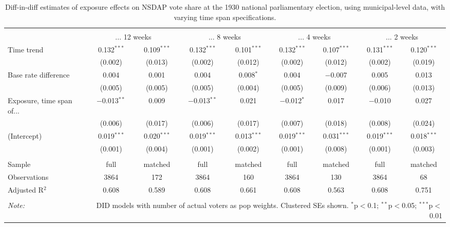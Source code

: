 
\begin{table}[!htbp] \centering 
  \caption{Diff-in-diff estimates of exposure effects on NSDAP vote share at the 1930 national parliamentary election, using municipal-level data, with varying time span specifications.\vspace{-.25cm}} 
  \label{tab:nsdap-voteshare-timespan-dd-1930comm} 
\scriptsize 
\begin{tabular}{@{\extracolsep{5pt}}lcccccccc} 
\\[-1.8ex]\hline 
\hline \\[-1.8ex] 
 & \multicolumn{2}{c}{... 12 weeks} & \multicolumn{2}{c}{... 8 weeks} & \multicolumn{2}{c}{... 4 weeks} & \multicolumn{2}{c}{... 2 weeks} \\ 
 \cmidrule(r){2-3}\cmidrule(r){4-5}\cmidrule(r){6-7}\cmidrule(r){8-9}Time trend & 0.132$^{***}$ & 0.109$^{***}$ & 0.132$^{***}$ & 0.101$^{***}$ & 0.132$^{***}$ & 0.107$^{***}$ & 0.131$^{***}$ & 0.120$^{***}$ \\ 
  & (0.002) & (0.013) & (0.002) & (0.012) & (0.002) & (0.012) & (0.002) & (0.019) \\ 
  Base rate difference & 0.004 & 0.001 & 0.004 & 0.008$^{*}$ & 0.004 & $-$0.007 & 0.005 & 0.013 \\ 
  & (0.005) & (0.005) & (0.005) & (0.004) & (0.005) & (0.009) & (0.006) & (0.013) \\ 
  Exposure, time span of... & $-$0.013$^{**}$ & 0.009 & $-$0.013$^{**}$ & 0.021 & $-$0.012$^{*}$ & 0.017 & $-$0.010 & 0.027 \\ 
  & (0.006) & (0.017) & (0.006) & (0.017) & (0.007) & (0.018) & (0.008) & (0.024) \\ 
  (Intercept) & 0.019$^{***}$ & 0.020$^{***}$ & 0.019$^{***}$ & 0.013$^{***}$ & 0.019$^{***}$ & 0.031$^{***}$ & 0.019$^{***}$ & 0.018$^{***}$ \\ 
  & (0.001) & (0.004) & (0.001) & (0.002) & (0.001) & (0.008) & (0.001) & (0.003) \\ 
 \hline \\[-1.8ex] 
Sample & full & matched & full & matched & full & matched & full & matched \\ 
Observations & 3864 & 172 & 3864 & 160 & 3864 & 130 & 3864 & 68 \\ 
Adjusted R$^{2}$ & 0.608 & 0.589 & 0.608 & 0.661 & 0.608 & 0.563 & 0.608 & 0.751 \\ 
\hline 
\hline \\[-1.8ex] 
\textit{Note:}  & \multicolumn{8}{r}{DID models with number of actual voters as pop weights. Clustered SEs shown. $^{*}$p$<$0.1; $^{**}$p$<$0.05; $^{***}$p$<$0.01} \\ 
\end{tabular} 
\end{table} 
